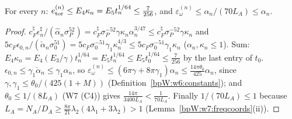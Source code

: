 \begin{lemma}\label{bpW:w8:etor}
For every $n$: $e^{(n)}_{\rm tor}\le E_4\kappa_n=E_5t_n^{1/64}\le\frac7{256}$, and
$\varepsilon^{(n)}_\omega\le\alpha_n/(70L_A)\le\alpha_n$.
\end{lemma}
\begin{proof}
\label{stepW:w8:e-tor} $c^\natural_F\epsilon^\sharp_n/(\hat\alpha_n\sigma_P^{52})=c^\natural_F\sigma_P^{-52}\gamma\kappa_n\alpha_n^{3/47}\le
c^\natural_F\sigma_P^{-52}\gamma\kappa_n$ and $5c_F\epsilon_{0,n}/(\check\alpha_n\sigma_0^{51})=5c_F\sigma_0^{-51}\gamma_1\kappa_n^{4/3}\le
5c_F\sigma_0^{-51}\gamma_1\kappa_n$ ($\alpha_n,\kappa_n\le1$). Sum: $E_4\kappa_n=E_4(E_3/\gamma)t_n^{1/64}=E_5t_n^{1/64}\le E_5t_0^{1/64}\le\frac7{256}$ by the last
entry of $t_0$.
\proofstep{$\varepsilon_\omega$}\label{stepW:w8:e-om} $\epsilon_{0,n}\le\gamma_1\check\alpha_n\le\gamma_1\alpha_n$, so
$\varepsilon^{(n)}_\omega\le(6\pi\gamma+8\pi\gamma_1)\alpha_n\le\frac{14\pi\theta_0}{425}\alpha_n$, since $\gamma,\gamma_1\le\theta_0/(425(1+M))$
(Definition~\ref{bpW:w6:constants}); and $\theta_0\le1/(8L_A)$ (W7 (C4)) gives $\frac{14\pi}{3400L_A}<\frac1{70L_A}$. Finally
$1/(70L_A)\le1$ because $L_A=N_A/D_A\ge\frac{8\pi}{21}\lambda_2(4\lambda_1+3\lambda_2)>1$ (Lemma~\ref{bpW:w7:freqcoords}(ii)).
\end{proof}

